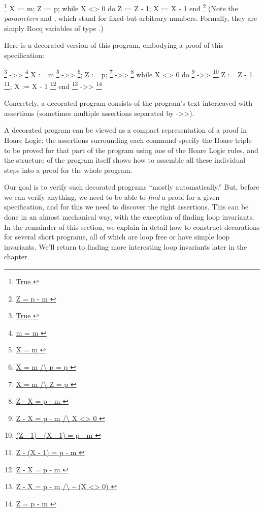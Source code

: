 \documentclass[12pt]{report}
\begin{document}
    \footnote{\url{ True }}
    X := m;
    Z := p;
    while X <> 0 do
      Z := Z - 1;
      X := X - 1
    end
    \footnote{\url{ Z = p - m }}
 (Note the \textit{parameters}  and , which stand for
   fixed-but-arbitrary numbers.  Formally, they are simply Rocq
   variables of type .) 

 Here is a decorated version of this program, embodying a
    proof of this specification:


    \footnote{\url{ True }} ->>
    \footnote{\url{ m = m }}
      X := m
                         \footnote{\url{ X = m }} ->>
                         \footnote{\url{ X = m /\ p = p }};
      Z := p;
                         \footnote{\url{ X = m /\ Z = p }} ->>
                         \footnote{\url{ Z - X = p - m }}
      while X <> 0 do
                         \footnote{\url{ Z - X = p - m /\ X <> 0 }} ->>
                         \footnote{\url{ (Z - 1) - (X - 1) = p - m }}
        Z := Z - 1
                         \footnote{\url{ Z - (X - 1) = p - m }};
        X := X - 1
                         \footnote{\url{ Z - X = p - m }}
      end
    \footnote{\url{ Z - X = p - m /\ ~ (X <> 0) }} ->>
    \footnote{\url{ Z = p - m }}


 Concretely, a decorated program consists of the program's text
    interleaved with assertions (sometimes multiple assertions
    separated by ->>). 

 A decorated program can be viewed as a compact representation of a
    proof in Hoare Logic: the assertions surrounding each command
    specify the Hoare triple to be proved for that part of the program
    using one of the Hoare Logic rules, and the structure of the
    program itself shows how to assemble all these individual steps
    into a proof for the whole program. 

 Our goal is to verify such decorated programs ``mostly
    automatically.''  But, before we can verify anything, we need to be
    able to \textit{find} a proof for a given specification, and for this we
    need to discover the right assertions. This can be done in an
    almost mechanical way, with the exception of finding loop
    invariants. In the remainder of this section, we explain in detail
    how to construct decorations for several short programs, all of
    which are loop free or have simple loop invariants. We'll return
    to finding more interesting loop invariants later in the chapter. 
\begin{coqdoccode}
\coqdocemptyline
\end{coqdoccode}
\end{document}
